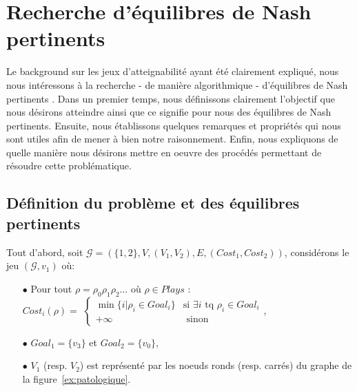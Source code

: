
\section{Recherche d'équilibres de Nash pertinents}

Le background sur les jeux d'atteignabilité ayant été clairement expliqué, nous nous intéressons à la recherche - de manière algorithmique - d'équilibres de Nash \og pertinents \fg. Dans un premier temps, nous définissons clairement l'objectif que nous désirons atteindre ainsi que ce signifie pour nous des équilibres de Nash pertinents. Ensuite, nous établissons quelques remarques et propriétés qui nous sont utiles afin de mener à bien notre raisonnement. Enfin, nous expliquons de quelle manière nous désirons mettre en oeuvre des procédés permettant de résoudre cette problématique.

\subsection{Définition du problème et des équilibres pertinents}

Tout d'abord, soit $\mathcal{G} = ( \{ 1,2 \}, V, (V_{1}, V_{2}),E, (Cost _{1},Cost _{2}))$, considérons le jeu $(\mathcal{G},v_{1})$ où:\begin{enumerate}
\item[$\bullet$] Pour tout  $\rho = \rho _{0} \rho _{1} \rho _{2} \ldots $ où $\rho \in Plays$ :\\$Cost_{i}(\rho) = $ $\begin{cases} 
								\min \{ i | \rho _{i} \in Goal_{i} \} & \text{si } \exists i \text{ tq } \rho _{i} \in Goal_{i} \\
								+\infty & \text{ sinon}
								\end{cases}$,
\item[$\bullet$] $Goal_{1} = \{ v_{3} \}$ et $Goal_{2} = \{ v_{0} \}$,
\item[$\bullet$]  $V_{1}$ (resp. $V_{2}$) est représenté par les noeuds ronds (resp. carrés) du graphe de la figure~\ref{ex:patologique}.

\end{enumerate}


